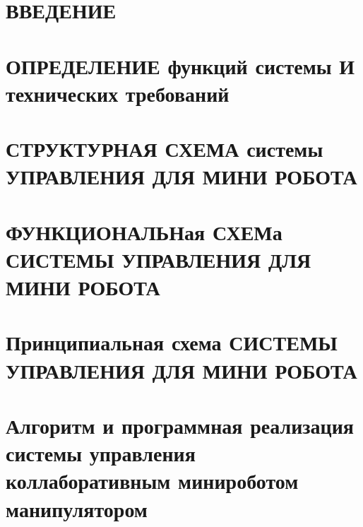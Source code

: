 
\section*{ВВЕДЕНИЕ}


\section{ОПРЕДЕЛЕНИЕ функций системы И технических требований}


\section{СТРУКТУРНАЯ СХЕМА системы УПРАВЛЕНИЯ ДЛЯ МИНИ РОБОТА }


\section{ФУНКЦИОНАЛЬНая СХЕМа СИСТЕМЫ УПРАВЛЕНИЯ ДЛЯ МИНИ РОБОТА}


\section{Принципиальная схема СИСТЕМЫ УПРАВЛЕНИЯ ДЛЯ МИНИ РОБОТА}

\section{Алгоритм и программная реализация системы управления коллаборативным минироботом манипулятором}






% 
